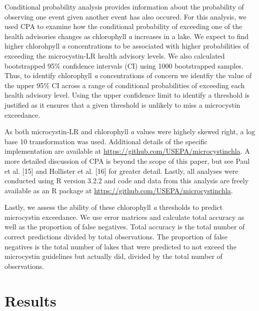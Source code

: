 \documentclass[10pt,a4paper,twocolumn]{article}
\begin{document}
Conditional probability analysis provides information about the
probability of observing one event given another event has also occured.
For this analysis, we used CPA to examine how the conditional
probability of exceeding one of the health advisories changes as
chlorophyll \emph{a} increases in a lake. We expect to find higher
chlorohpyll \emph{a} concentrations to be associated with higher
probabilities of exceeding the microcystin-LR health advisory levels. We
also calculated bootstrapped 95\% confidence intervals (CI) using 1000
bootstrapped samples. Thus, to identify chlorophyll \emph{a}
concentrations of concern we identfiy the value of the upper 95\% CI
across a range of conditional probabilities of exceeding each health
advisory level. Using the upper confidence limit to identify a threshold
is justified as it ensures that a given threshold is unlikely to miss a
microcystin exceedance.

As both microcystin-LR and chlorophyll \emph{a} values were highely
skewed right, a log base 10 transformation was used. Additional details
of the specific implementation are available at
\url{https://github.com/USEPA/microcystinchla}. A more detailed
discussion of CPA is beyond the scope of this paper, but see Paul et al.
{[}15{]} and Hollister et al. {[}16{]} for greater detail. Lastly, all
analyses were conducted using R version 3.2.2 and code and data from
this analysis are freely available as an R package at
\href{https://github.com/USAPE/microcystinchla}{\url{https://github.com/USEPA/microcystinchla}}.

Lastly, we assess the ability of these chlorophyll \emph{a} thresholds
to predict microcystin exceedance. We use error matrices and calculate
total accuracy as well as the proportion of false negatives. Total
accuracy is the total number of correct predictions divided by total
observations. The proportion of false negatives is the total number of
lakes that were predicted to not exceed the microcystin guidelines but
actually did, divided by the total number of observations.

\section{Results}\label{results}
\end{document}
